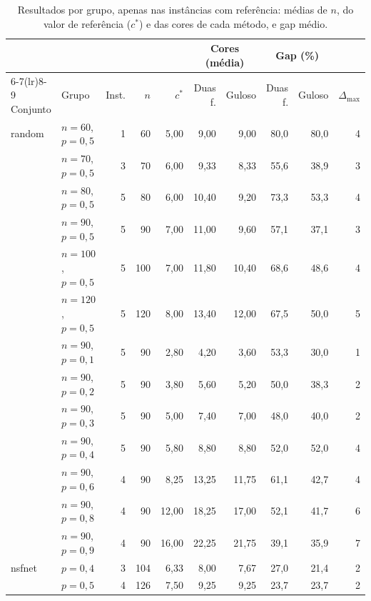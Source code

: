 \documentclass[12pt]{article}
\begin{document}
\begin{table}[ht]
  \centering
  \caption{Resultados por grupo, apenas nas instâncias com referência: médias de
    $n$, do valor de referência ($c^*$) e das cores de cada método, e gap
    médio.}
  \label{tab:grupos}
  \footnotesize\setlength{\tabcolsep}{4pt}
  \begin{tabular}{llrrrrrrrr}
    \toprule
    & & & & & \multicolumn{2}{c}{Cores (média)} & \multicolumn{2}{c}{Gap (\%)} & \\
    \cmidrule(lr){6-7}\cmidrule(lr){8-9}
    Conjunto & Grupo & Inst. & $n$ & $c^*$ & Duas f. & Guloso & Duas f. & Guloso & $\Delta_{\max}$ \\
    \midrule
    random & $n=60$,  $p=0{,}5$ & 1 & 60  & 5,00  & 9,00  & 9,00  & 80,0 & 80,0 & 4 \\
           & $n=70$,  $p=0{,}5$ & 3 & 70  & 6,00  & 9,33  & 8,33  & 55,6 & 38,9 & 3 \\
           & $n=80$,  $p=0{,}5$ & 5 & 80  & 6,00  & 10,40 & 9,20  & 73,3 & 53,3 & 4 \\
           & $n=90$,  $p=0{,}5$ & 5 & 90  & 7,00  & 11,00 & 9,60  & 57,1 & 37,1 & 3 \\
           & $n=100$, $p=0{,}5$ & 5 & 100 & 7,00  & 11,80 & 10,40 & 68,6 & 48,6 & 4 \\
           & $n=120$, $p=0{,}5$ & 5 & 120 & 8,00  & 13,40 & 12,00 & 67,5 & 50,0 & 5 \\
           & $n=90$,  $p=0{,}1$ & 5 & 90  & 2,80  & 4,20  & 3,60  & 53,3 & 30,0 & 1 \\
           & $n=90$,  $p=0{,}2$ & 5 & 90  & 3,80  & 5,60  & 5,20  & 50,0 & 38,3 & 2 \\
           & $n=90$,  $p=0{,}3$ & 5 & 90  & 5,00  & 7,40  & 7,00  & 48,0 & 40,0 & 2 \\
           & $n=90$,  $p=0{,}4$ & 5 & 90  & 5,80  & 8,80  & 8,80  & 52,0 & 52,0 & 4 \\
           & $n=90$,  $p=0{,}6$ & 4 & 90  & 8,25  & 13,25 & 11,75 & 61,1 & 42,7 & 4 \\
           & $n=90$,  $p=0{,}8$ & 4 & 90  & 12,00 & 18,25 & 17,00 & 52,1 & 41,7 & 6 \\
           & $n=90$,  $p=0{,}9$ & 4 & 90  & 16,00 & 22,25 & 21,75 & 39,1 & 35,9 & 7 \\
    \midrule
    nsfnet & $p=0{,}4$ & 3 & 104 & 6,33  & 8,00  & 7,67  & 27,0 & 21,4 & 2 \\
           & $p=0{,}5$ & 4 & 126 & 7,50  & 9,25  & 9,25  & 23,7 & 23,7 & 2 \\

\end{tabular}
\end{table}
\end{document}
